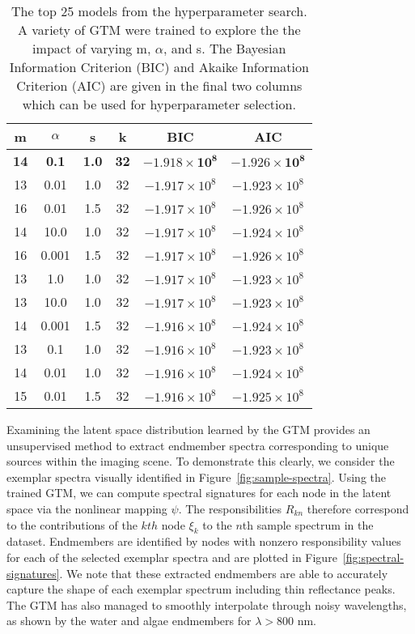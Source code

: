 \begin{table}
  \caption{The top 25 models from the hyperparameter search. A variety of GTM
    were trained to explore the the impact of varying m, $\alpha$, and s. The
    Bayesian Information Criterion (BIC) and Akaike Information Criterion (AIC)
    are given in the final two columns which can be used for hyperparameter
    selection.}
  \label{tab:hp-search}
  \begin{center}
  \begin{tabular}{cccccc} \hline
    \textbf{m} & \textbf{\boldmath$\alpha$} & \textbf{s} & \textbf{k} & \textbf{BIC} & \textbf{AIC} \\ \hline
    \textbf{14} & \textbf{0.1} & \textbf{1.0} & \textbf{32} & $\mathbf{-1.918 \times 10^8}$ & $\mathbf{-1.926 \times 10^8}$\\
    13 & 0.01 & 1.0 & 32 & $-1.917 \times 10^8$ & $-1.923 \times 10^8$\\
    16 & 0.01 & 1.5 & 32 & $-1.917 \times 10^8$ & $-1.926 \times 10^8$\\
    14 & 10.0 & 1.0 & 32 & $-1.917 \times 10^8$ & $-1.924 \times 10^8$\\
    16 & 0.001 & 1.5 & 32 & $-1.917 \times 10^8$ & $-1.926 \times 10^8$\\
    13 & 1.0 & 1.0 & 32 & $-1.917 \times 10^8$ & $-1.923 \times 10^8$\\
    13 & 10.0 & 1.0 & 32 & $-1.917 \times 10^8$ & $-1.923 \times 10^8$\\
    14 & 0.001 & 1.5 & 32 & $-1.916 \times 10^8$ & $-1.924 \times 10^8$\\
    13 & 0.1 & 1.0 & 32 & $-1.916 \times 10^8$ & $-1.923 \times 10^8$\\
    14 & 0.01 & 1.0 & 32 & $-1.916 \times 10^8$ & $-1.924 \times 10^8$\\
    15 & 0.01 & 1.5 & 32 & $-1.916 \times 10^8$ & $-1.925 \times 10^8$\\
  \end{tabular}
  \end{center}
\end{table}


Examining the latent space distribution learned by the GTM provides an unsupervised method to extract endmember spectra corresponding to unique sources within the imaging scene. To demonstrate this clearly, we consider the exemplar spectra visually identified in Figure~\ref{fig:sample-spectra}. Using the trained GTM, we can compute spectral signatures for each node in the latent space via the nonlinear mapping $\psi$. The responsibilities $R_{kn}$ therefore correspond to the contributions of the $kth$ node $\xi_k$ to the $n$th sample spectrum in the dataset. Endmembers are identified by nodes with nonzero responsibility values for each of the selected exemplar spectra and are plotted in Figure~\ref{fig:spectral-signatures}. We note that these extracted endmembers are able to accurately capture the shape of each exemplar spectrum including thin reflectance peaks. The GTM has also managed to smoothly interpolate through noisy wavelengths, as shown by the water and algae endmembers for $\lambda > 800$ nm. 

